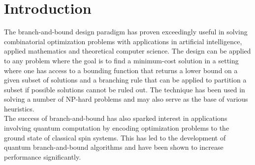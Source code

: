 
\section{Introduction}
	The branch-and-bound design paradigm has proven exceedingly useful in solving combinatorial optimization problems with applications in artificial intelligence, applied mathematics and theoretical computer science. 
	The design can be applied to any problem where the goal is to find a minimum-cost solution in a setting where one has access to a bounding function that returns a lower bound on a given subset of solutions and a branching rule that can be applied to partition a subset if possible solutions cannot be ruled out. 
	The technique has been used in solving a number of NP-hard problems and may also serve as the base of various heuristics.\\
	\indent
	The success of branch-and-bound has also sparked interest in applications involving quantum computation by encoding optimization problems to the ground state of classical spin systems. 
	This has led to the development of quantum branch-and-bound algorithms and have been shown to increase performance significantly. 
	
	
	